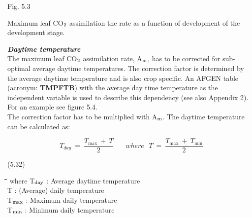 \documentclass[11pt]{article}
\newcommand{\FigDir}{.}
\begin{document}
\begin{figure}[htbp]
\begin{forcewidth}{8.44cm}
 \begin{center}\InputPS{\FigDir/AMAXTB.eps} \end{center}
\end{forcewidth}
\end{figure}

\bigskip
\bigskip
\bigskip
\bigskip
\bigskip
\bigskip
\bigskip
\bigskip
\bigskip
\bigskip
\bigskip
\bigskip
\bigskip
Fig. 5.3
\testlastline

\begin{indenting}{2.54cm}
Ma\-xi\-mum leaf CO$_{{\rm 2}}$ assimilation the rate as a function of develop\-ment of
the develop\-ment stage.
\end{indenting}

 \bigskip
 {\bf {\it Daytime temperature\/}}\\
The maximum leaf CO$_{{\rm 2}}$ assimilation rate, A$_{{\rm m}}$, has to be corrected for sub-optimal average
daytime tempera\-tures. The correction factor is determined by the average daytime
temperature and is also crop specific. An AFGEN table (acronym: {\bf TMPFTB}) with the
average day time temperature as the independent variable is used to describe this
dependency (see also Appendix 2). For an example see figure 5.4. \\
The correction factor has to be multiplied with A$_{{\rm m}}$. The daytime temperature can be
calculated as:

\begin{displaymath}
T _{day} ~=~{\frac{T _{\max } ~ +~  T }{2}} ~~~~~~~~ where ~~~ T~=~{\frac{T _{\max } ~+~ T _{\min } }{2}}
\end{displaymath}

 \bigskip
\strut\hfill (5.32)

\nwln
\begin{tabbing}
\hspace{1.27cm}\=\hspace{1.27cm}\=\hspace{1.27cm}\=\hspace{1.27cm}\=%
\hspace{1.27cm}\=\hspace{1.27cm}\=\hspace{1.27cm}\=\hspace{1.27cm}\=%
\hspace{1.27cm}\=\hspace{1.27cm}\=\kill
where\> T$_{{\rm day}}$\> : Average daytime temperature\> \> \> \> \> \> \> \> [\degrees C]\\
\>T\> : (Average) daily temperature\> \> \> \> \> \> \> \> [\degrees C]\\
\>T$_{{\rm max}}$\> : Maximum daily temperature\> \> \> \> \> \> \> \> [\degrees C]\\
\>T$_{{\rm min}}$ \> : Minimum daily temperature\> \> \> \> \> \> \> \> [\degrees C]
\end{tabbing}
\end{document}
